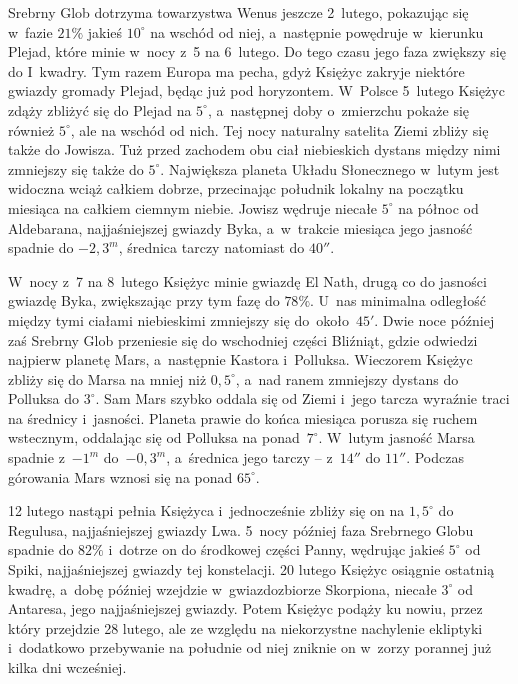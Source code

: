 {\begin{dwieszpalty}
Srebrny Glob dotrzyma towarzystwa Wenus jeszcze 2~lutego, pokazując się w~fazie $21\%$ jakieś $10^{\circ}$ na wschód od niej, a~następnie powędruje w~kierunku Plejad, które minie w~nocy z~5 na 6~lutego. Do tego czasu jego faza zwiększy się do I~kwadry. Tym razem Europa ma pecha, gdyż Księżyc zakryje niektóre gwiazdy gromady Plejad, będąc już pod horyzontem. W~Polsce 5~lutego Księżyc zdąży zbliżyć się do Plejad na $5^{\circ}$, a~następnej doby o~zmierzchu pokaże się również $5^{\circ}$, ale na wschód od nich. Tej nocy naturalny satelita Ziemi zbliży się także do Jowisza. Tuż przed zachodem obu ciał niebieskich dystans między nimi zmniejszy się także do $5^{\circ}$. Największa planeta Układu Słonecznego w~lutym jest widoczna wciąż całkiem dobrze, przecinając południk lokalny na początku miesiąca na całkiem ciemnym niebie. Jowisz wędruje niecałe $5^{\circ}$ na północ od Aldebarana, najjaśniejszej gwiazdy Byka, a~w~trakcie miesiąca jego jasność spadnie do $-2,3^m$, średnica tarczy natomiast do $40''$.

W~nocy z~7 na 8~lutego Księżyc minie gwiazdę El Nath, drugą co do jasności gwiazdę Byka, zwiększając przy tym fazę do $78\%$. U~nas minimalna odległość między tymi ciałami niebieskimi zmniejszy się do~około~$45'$. Dwie noce później zaś Srebrny Glob przeniesie się do wschodniej części Bliźniąt, gdzie odwiedzi najpierw planetę Mars, a~następnie Kastora i~Polluksa. Wieczorem Księżyc zbliży się do Marsa na mniej niż $0,5^{\circ}$, a~nad ranem zmniejszy dystans do Polluksa do $3^{\circ}$. Sam Mars szybko oddala się od Ziemi i~jego tarcza wyraźnie traci na średnicy i~jasności. Planeta prawie do końca miesiąca porusza się ruchem wstecznym, oddalając się od Polluksa na ponad~$7^{\circ}$. W~lutym jasność Marsa spadnie z~$-1^m$ do~$-0,3^m$, a~średnica jego tarczy -- z~$14''$ do $11''$. Podczas górowania Mars wznosi się na ponad $65^{\circ}$.

12 lutego nastąpi pełnia Księżyca i~jednocześnie zbliży się on na $1,5^{\circ}$ do Regulusa, najjaśniejszej gwiazdy Lwa. 5~nocy później faza Srebrnego Globu spadnie do $82\%$ i~dotrze on do środkowej części Panny, wędrując jakieś $5^{\circ}$ od Spiki, najjaśniejszej gwiazdy tej konstelacji. 20 lutego Księżyc osiągnie ostatnią kwadrę, a~dobę później wzejdzie w~gwiazdozbiorze Skorpiona, niecałe $3^{\circ}$ od Antaresa, jego najjaśniejszej gwiazdy. Potem Księżyc podąży ku nowiu, przez który przejdzie 28 lutego, ale ze względu na niekorzystne nachylenie ekliptyki i~dodatkowo przebywanie na południe od niej zniknie on w~zorzy porannej już kilka dni wcześniej.


\end{dwieszpalty}}
